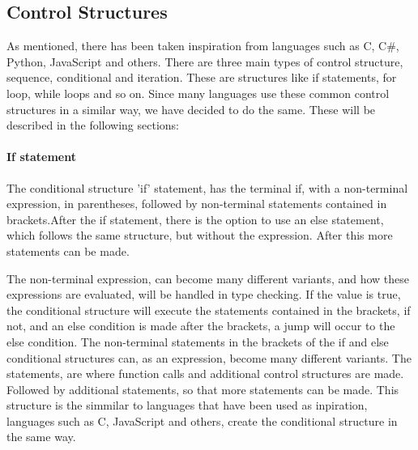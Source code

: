 \subsection{Control Structures}
As mentioned, there has been taken inspiration from languages such as C, C\#, Python, JavaScript and others. There are three main types of control structure, sequence, conditional and iteration. These are structures like if statements, for loop, while loops and so on. Since many languages use these common control structures in a similar way, we have decided to do the same. These will be described in the following sections:

\paragraph*{If statement}
The conditional structure 'if' statement, has the terminal if, with a non-terminal expression, in parentheses, followed by non-terminal statements contained in brackets.After the if statement, there is the option to use an else statement, which follows the same structure, but without the expression. After this more statements can be made.

The non-terminal expression, can become many different variants, and how these expressions are evaluated, will be handled in type checking. If the value is true, the conditional structure will execute the statements contained in the brackets, if not, and an else condition is made after the brackets, a jump will occur to the else condition.
The non-terminal statements in the brackets of the if and else conditional structures can, as an expression, become many different variants. The statements, are where function calls and additional control structures are made.
Followed by additional statements, so that more statements can be made.
This structure is the simmilar to languages that have been used as inpiration, languages such as C, JavaScript and others, create the conditional structure in the same way.


